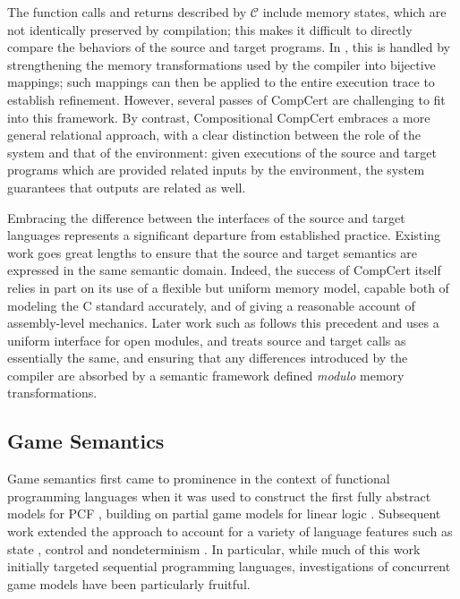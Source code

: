 \documentclass[sigplan,10pt,review,anonymous]{acmart}
\begin{document}
The function calls and returns described by $\mathcal{C}$
include memory states,
which are not identically preserved by compilation;
this makes it difficult to directly compare the behaviors
of the source and target programs.
In \cite{cpp15},
this is handled by strengthening the memory transformations
used by the compiler into bijective mappings;
such mappings can then be applied to the entire execution trace
to establish refinement.
However, several passes of CompCert are challenging
to fit into this framework.
By contrast,
Compositional CompCert
embraces a more general relational approach,
with a clear distinction between the role of the system
and that of the environment:
given executions of the source and target programs
which are provided related inputs by the environment,
the system guarantees that outputs are related as well.



Embracing the difference between the interfaces of
the source and target languages
represents a significant departure from established practice.
Existing work goes great lengths
to ensure that the source and target semantics
are expressed in the same semantic domain.
Indeed,
the success of CompCert itself
relies in part on its use of a flexible
but uniform memory model,
capable both of modeling the C standard accurately,
and of giving a reasonable account
of assembly-level mechanics.
Later work such as \cite{compcompcert,cpp15}
follows this precedent and uses
a uniform interface for open modules,
and treats source and target calls
as essentially the same,
and ensuring that any differences introduced by the compiler
are absorbed by a semantic framework
defined \emph{modulo} memory transformations.

\subsection{Game Semantics} %

Game semantics first came to prominence
in the context of functional programming languages when
it was used to construct
the first fully abstract models for PCF
\cite{pcfajm,pcfho},
building on partial game models for linear logic
\cite{gsll,gsllaj}.
Subsequent work
extended the approach to account for a variety of
language features such as
state \cite{gsia},
control \cite{gscontrol} and
nondeterminism \cite{gsnondet}.
In particular,
while much of this work initially
targeted sequential programming languages,
investigations of concurrent game models
have been particularly fruitful.
\end{document}
